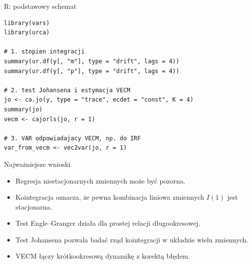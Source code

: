 \documentclass[11pt,aspectratio=169,xcolor=dvipsnames]{beamer}
\begin{document}
\begin{frame}[fragile]{R: podstawowy schemat}
\tiny
\begin{verbatim}
library(vars)
library(urca)

# 1. stopien integracji
summary(ur.df(y[, "m"], type = "drift", lags = 4))
summary(ur.df(y[, "p"], type = "drift", lags = 4))

# 2. test Johansena i estymacja VECM
jo <- ca.jo(y, type = "trace", ecdet = "const", K = 4)
summary(jo)
vecm <- cajorls(jo, r = 1)

# 3. VAR odpowiadajacy VECM, np. do IRF
var_from_vecm <- vec2var(jo, r = 1)
\end{verbatim}
\end{frame}

\begin{frame}{Najważniejsze wnioski}
  \begin{itemize}
    \item Regresja niestacjonarnych zmiennych może być pozorna.
    \item Kointegracja oznacza, że pewna kombinacja liniowa zmiennych $I(1)$ jest stacjonarna.
    \item Test Engle--Granger działa dla prostej relacji długookresowej.
    \item Test Johansena pozwala badać rząd kointegracji w układzie wielu zmiennych.
    \item VECM łączy krótkookresową dynamikę z korektą błędem.
  \end{itemize}
\end{frame}
\end{document}
